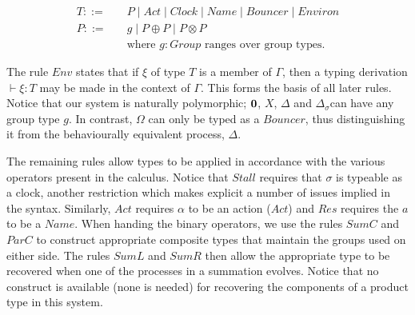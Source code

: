 \begin{equation*}
\label{eqn:tnt:typesyntax}
\begin{aligned}
T \mathrel{::=} & \quad P \mid Act \mid Clock \mid Name \mid Bouncer \mid
 Environ \\
P \mathrel{::=} & \quad g \mid P \oplus P \mid P \otimes P \\
                & \quad \text{where $g \colon Group$ ranges over group types.}
\end{aligned}
\end{equation*}

The rule $Env$ states that if $\xi$ of type $T$ is a member of
$\Gamma$, then a typing derivation $\vdash \xi : T$ may be made in the
context of $\Gamma$.  This forms the basis of all later rules.  Notice
that our system is naturally polymorphic; $\textbf{0}$, $X$, $\Delta$ and
$\Delta_\sigma$can have any group type $g$.  In contrast, $\Omega$ can
only be typed as a $Bouncer$, thus distinguishing it from the
behaviourally equivalent process, $\Delta$.

The remaining rules allow types to be applied in accordance with the
various operators present in the calculus.  Notice that $Stall$ requires
that $\sigma$ is typeable as a clock, another restriction which makes
explicit a number of issues implied in the syntax.  Similarly, $Act$
requires $\alpha$ to be an action ($Act$) and $Res$ requires the $a$ to
be a $Name$.  When handing the binary operators, we use the rules $SumC$
and $ParC$ to construct appropriate composite types that maintain the
groups used on either side.  The rules $SumL$ and $SumR$ then allow the
appropriate type to be recovered when one of the processes in a
summation evolves.  Notice that no construct is available (none is
needed) for recovering the components of a product type in this system.

